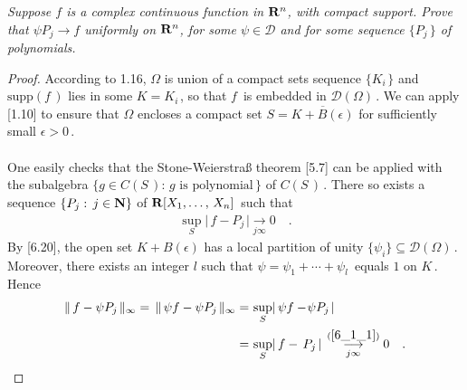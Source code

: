 {\it  Suppose $f$ is a complex continuous function in ${\mathbf R}^n$, with compact support. \!\!Prove that $\psi P_j\to \!f$ uniformly on ${\mathbf R}^n$, for some $\psi\in \mathscr{D}$ and for some sequence $\{P_j\,\}$ of polynomials.}
\begin{proof} According to 1.16, $\Omega$ is union of a compact sets sequence $\{K_{i\,}\}$ and $\text{supp} (f\,)$ lies in some $K= K_{i\,}$, so that $f\,$ is embedded in $\mathscr{D}(\Omega)\,$. We can apply [1.10] to ensure that $\Omega$ encloses a compact set $S=\overline{K +B(\epsilon)}$ for sufficiently small $\epsilon>0\,$.\\
\\
One easily checks that the Stone-Weierstraß theorem [5.7] can be applied with the subalgebra $ \{ g\in C(S\,) :\, g \text{ is polynomial}\,\}$ of $C(S\,)\,$.
There so exists a sequence $\{P_j:\, j\in {\mathbf N}\}$ of ${\mathbf R}[X_1,\dotsc,\, X_n]\,$ such that 
\begin{align}\label{6_1_1}
\sup_S \lvert\, f-P_{j\,} \rvert  \underset{j\infty}{\longrightarrow} 0\quad.
\end{align} 
 By [6.20], the open set $K +B(\epsilon)$ has a local partition of unity $\{\psi_i\}\subseteq \mathscr{D}(\Omega)\,$. Moreover, there exists an integer $l$ such that $\psi=\psi_1+\dotsb+\psi_l\,$ equals $1$ on $K\,$. Hence
\begin{align}\label{6_1_2}
\| \, f - \psi P_{j\,}\|_\infty=  \, \|  \,\psi f - \psi P_{j\,}\|_\infty 
=  &  \, \sup_S  \lvert \, \psi f -\! \psi P_{j\,}\rvert  \\
   =  &  \,   \sup_S  \lvert  \, f -  \, P_{j\,} \rvert    \, \overset{(\ref{6_1_1})}{\underset{j\infty}{\longrightarrow}} 0\quad .
\end{align} 
\end{proof}
